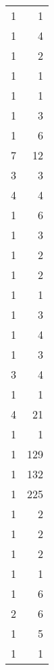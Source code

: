 \begin{tabular}{rr}
                  1 &             1 \\
                  1 &             4 \\
                  1 &             2 \\
                  1 &             1 \\
                  1 &             1 \\
                  1 &             3 \\
                  1 &             6 \\
                  7 &            12 \\
                  3 &             3 \\
                  4 &             4 \\
                  1 &             6 \\
                  1 &             3 \\
                  1 &             2 \\
                  1 &             2 \\
                  1 &             1 \\
                  1 &             3 \\
                  1 &             4 \\
                  1 &             3 \\
                  3 &             4 \\
                  1 &             1 \\
                  4 &            21 \\
                  1 &             1 \\
                  1 &           129 \\
                  1 &           132 \\
                  1 &           225 \\
                  1 &             2 \\
                  1 &             2 \\
                  1 &             2 \\
                  1 &             1 \\
                  1 &             6 \\
                  2 &             6 \\
                  1 &             5 \\
                  1 &             1 \\

\end{tabular}
